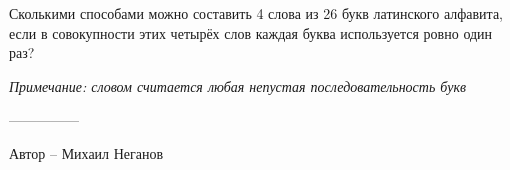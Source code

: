 \question
Сколькими способами можно составить 4 слова из 26 букв латинского алфавита, если в совокупности этих четырёх слов каждая буква используется ровно один раз?

\textit{Примечание: словом считается любая непустая последовательность букв}

---------------

Автор -- Михаил Неганов
